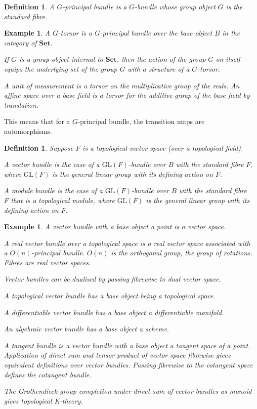 \documentclass{tufte-book}
\newtheorem{definition}[theorem]{Definition}
\newtheorem{example}[theorem]{Example}
\begin{document}
\begin{definition}
	A $G$-principal bundle is a $G$-bundle whose group object $G$ is the standard fibre.
\end{definition}

\begin{example}
	A $G$-torsor is a $G$-principal bundle over the base object $B$ in the category of $\mathbf{Set}$.

	If $G$ is a group object internal to $\mathbf{Set}$, then the action of the group $G$ on itself equips the underlying set of the group $G$ with a structure of a $G$-torsor.

	A unit of measurement is a torsor on the multiplicative group of the reals. An affine space over a base field is a torsor for the additive group of the base field by translation.
\end{example}

This means that for a $G$-principal bundle, the transition maps are automorphisms.

\begin{definition}
	Suppose $F$ is a topological vector space (over a topological field).
	
	A vector bundle is the case of a $\mathrm{GL}(F)$-bundle over $B$ with the standard fibre $F$, where $\mathrm{GL}(F)$ is the general linear group with its defining action on $F$.

	A module bundle is the case of a $\mathrm{GL}(F)$-bundle over $B$ with the standard fibre $F$ that is a topological module, where $\mathrm{GL}(F)$ is the general linear group with its defining action on $F$.
\end{definition}

\begin{example}
	A vector bundle with a base object a point is a vector space.

	A real vector bundle over a topological space is a real vector space associated with a $O(n)$-principal bundle. $O(n)$ is the orthogonal group, the group of rotations. Fibres are real vector spaces.

	Vector bundles can be dualised by passing fibrewise to dual vector space.

	A topological vector bundle has a base object being a topological space.

	A differentiable vector bundle has a base object a differentiable manifold.

	An algebraic vector bundle has a base object a scheme.

	A tangent bundle is a vector bundle with a base object a tangent space of a point.
	Application of direct sum and tensor product of vector space fibrewise gives equivalent definitions over vector bundles. Passing fibrewise to the cotangent space defines the cotangent bundle.
	
	The Grothendieck group completion under direct sum of vector bundles as monoid gives topological K-theory.
\end{example}
\end{document}
